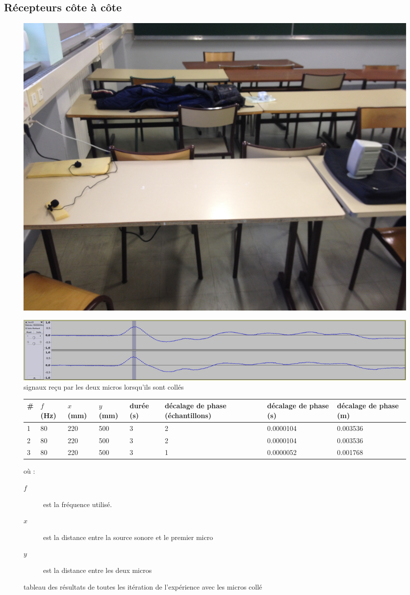 \documentclass[12pt,a4paper]{report}
\begin{document}
\subsection{Récepteurs côte à côte}
\begin{figure}[H]
\includegraphics[width=\textwidth]{../tests/test_du_protocole/micros_cote_a_cote.jpg} 
\end{figure}

\begin{figure}[H]
\includegraphics[width=\textwidth]{../tests/test_du_protocole/mesures_micro_colles/colles.png} 
\caption{signaux reçu par les deux micros lorsqu'ils sont collés}
\end{figure}

\begin{figure}[H]
\begin{tabular}{|l || p{1.4cm} | p{1.4cm} | p{1.4cm} | p{1.4cm} | p{1.4cm} | p{1.7cm} | p{1.7cm}  |}
\hline
\# & $f$ (Hz) & $x$ (mm) & $y$ (mm) & durée (s) & décalage de phase (échantillons) & décalage de phase (s) & décalage de phase (m)\\
\hline
\hline
1	&80	&220	&500	&3	&2	&0.0000104	&0.003536\\
2	&80	&220	&500	&3	&2	&0.0000104	&0.003536\\
3	&80	&220	&500	&3	&1	&0.0000052	&0.001768\\
\hline
\end{tabular}
où : 
\begin{description}
\item[$f$] est la fréquence utilisé.
\item[$x$] est la distance entre la source sonore et le premier micro
\item[$y$] est la distance entre les deux micros
\end{description}
\caption{tableau des résultats de toutes les itération de l'expérience avec les micros collé}
\end{figure}
\end{document}
